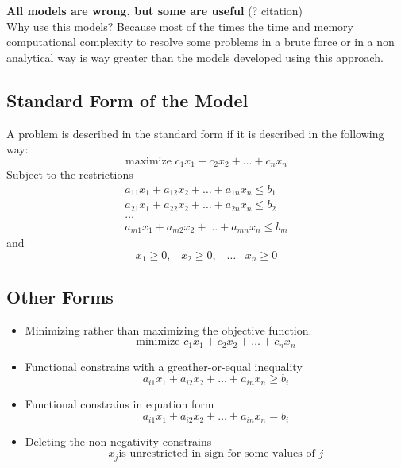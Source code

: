 \textbf{All models are wrong, but some are useful} (? citation)\\

Why use this models? Because most of the times the time and memory computational complexity to resolve some problems in a brute force
or in a non analytical way is way greater than the models developed using this approach.

\subsection{Standard Form of the Model}
A problem is described in the standard form if it is described in the following way:\\
\[ \text{maximize } c_1x_1 + c_2x_2 + \dots + c_nx_n\]
Subject to the restrictions
\begin{gather*}
    a_{11}x_1 + a_{12}x_2 + \dots + a_{1n}x_n \leq b_1 \\
    a_{21}x_1 + a_{22}x_2 + \dots + a_{2n}x_n \leq b_2 \\
    \dots\\
    a_{m1}x_1 + a_{m2}x_2 + \dots + a_{mn}x_n \leq b_m
\end{gather*}
and
\[ x_1 \geq 0,\;\;\; x_2 \geq 0,\;\;\; \dots\;\;\; x_n \geq 0 \]

\subsection{Other Forms}
\begin{itemize}
    \item Minimizing rather than maximizing the objective function.
    \[ \text{minimize } c_1x_1 + c_2x_2 + \dots + c_nx_n\]
    \item Functional constrains with a greather-or-equal inequality
    \[ a_{i1}x_1 + a_{i2}x_2 + \dots + a_{in}x_n \geq b_i \]
    \item Functional constrains in equation form
    \[ a_{i1}x_1 + a_{i2}x_2 + \dots + a_{in}x_n = b_i \]
    \item Deleting the non-negativity constrains
    \[ x_j \text{is unrestricted in sign for some values of } j \]
\end{itemize}

